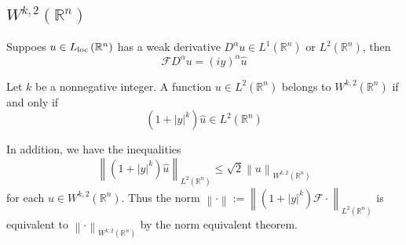 \subsection{\texorpdfstring{$W^{k,2}(\mathbb{R}^n)$}{}}
\begin{lemma}
    Suppoes $u\in L_{\operatorname{\operatorname{loc}}}\left(\mathbb{R}^n\right)$ has a weak derivative $D^\alpha u \in L^1 (\mathbb{R}^n)$ or $L^2(\mathbb{R}^n)$, then
    \begin{equation*}
        \mathcal{F}D^\alpha u
        =
        (iy)^\alpha \hat{u}
    \end{equation*}
\end{lemma}

\begin{theorem}
    Let $k$ be a nonnegative integer.
    A function $u \in L^2\left(\mathbb{R}^n\right)$ belongs to $W^{k,2}\left(\mathbb{R}^n\right)$ if and only if
    \begin{equation*}
        \left(1+\left|y\right|^k\right)
        \hat{u} \in L^2\left(\mathbb{R}^n\right)
    \end{equation*}
    \begin{remark}
        In addition, we have the inequalities
        \begin{equation*}
            \left\|\left(1+|y|^k\right) \hat{u}\right\|_{L^2\left(\mathbb{R}^n\right)}
            \leq
            \sqrt{2} \left\|u\right\|_{W^{k,2}\left(\mathbb{R}^n\right)}
        \end{equation*}
        for each $u \in W^{k,2}\left(\mathbb{R}^n\right)$. Thus the norm $\left\|\cdot\right\|:= \left\|\left(1+|y|^k\right) \mathcal{F}\cdot\right\|_{L^2\left(\mathbb{R}^n\right)}$ is equivalent to $\left\|\cdot\right\|_{W^{k,2}\left(\mathbb{R}^n\right)}$ by the norm equivalent theorem.
    \end{remark}


\end{theorem}
